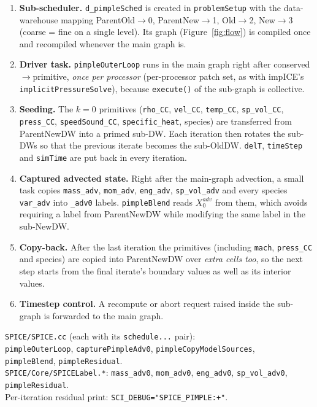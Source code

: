 \documentclass[11pt]{article}
\newcommand{\code}[1]{\texttt{\small #1}}
\newcommand{\file}[1]{\texttt{\small\color{Moss}#1}}
\begin{document}
\begin{enumerate}[leftmargin=*]
  \item \textbf{Sub-scheduler.} \code{d\_pimpleSched} is created in \code{problemSetup} with the
        data-warehouse mapping ParentOld$\to$0, ParentNew$\to$1, Old$\to$2, New$\to$3 (coarse = fine
        on a single level). Its graph (Figure~\ref{fig:flow}) is compiled once and recompiled
        whenever the main graph is.
  \item \textbf{Driver task.} \code{pimpleOuterLoop} runs in the main graph right after
        conserved$\to$primitive, \emph{once per processor} (per-processor patch set, as with
        impICE's \code{implicitPressureSolve}), because \code{execute()} of the sub-graph is
        collective.
  \item \textbf{Seeding.} The $k=0$ primitives (\code{rho\_CC}, \code{vel\_CC}, \code{temp\_CC},
        \code{sp\_vol\_CC}, \code{press\_CC}, \code{speedSound\_CC}, \code{specific\_heat}, species)
        are transferred from ParentNewDW into a primed sub-DW. Each iteration then rotates the
        sub-DWs so that the previous iterate becomes the sub-OldDW. \code{delT},
        \code{timeStep} and \code{simTime} are put back in every iteration.
  \item \textbf{Captured advected state.} Right after the main-graph advection, a small task
        copies \code{mass\_adv}, \code{mom\_adv}, \code{eng\_adv}, \code{sp\_vol\_adv} and every
        species \code{var\_adv} into \code{*\_adv0} labels. \code{pimpleBlend} reads $X^{adv}_0$ from
        them, which avoids requiring a label from ParentNewDW while modifying the same label in
        the sub-NewDW.
  \item \textbf{Copy-back.} After the last iteration the primitives (including \code{mach},
        \code{press\_CC} and species) are copied into ParentNewDW over \emph{extra cells too},
        so the next step starts from the final iterate's boundary values as well as its
        interior values.
  \item \textbf{Timestep control.} A recompute or abort request raised inside the sub-graph is
        forwarded to the main graph.
\end{enumerate}

\begin{incode}
\file{SPICE/SPICE.cc} (each with its \code{schedule...} pair):\\
\hspace*{1em}\code{pimpleOuterLoop}, \code{capturePimpleAdv0}, \code{pimpleCopyModelSources},\\
\hspace*{1em}\code{pimpleBlend}, \code{pimpleResidual}.\\
\file{SPICE/Core/SPICELabel.*}: \code{mass\_adv0}, \code{mom\_adv0}, \code{eng\_adv0}, \code{sp\_vol\_adv0},
\code{pimpleResidual}.\\
Per-iteration residual print: \code{SCI\_DEBUG="SPICE\_PIMPLE:+"}.
\end{incode}
\end{document}
